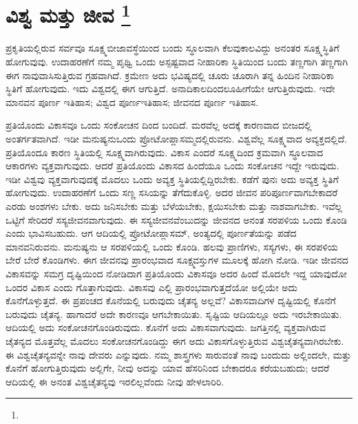 
\vspace{-0.5cm}

\chapter[ವಿಶ್ವ ಮತ್ತು ಜೀವ ]{ವಿಶ್ವ ಮತ್ತು ಜೀವ \protect\footnote{}}

ಪ್ರಕೃತಿಯಲ್ಲಿರುವ ಸರ್ವವೂ ಸೂಕ್ಷ್ಮಬೀಜಾವಸ್ಥೆಯಿಂದ ಬಂದು ಸ್ಥೂಲವಾಗಿ ಕೆಲವು\break ಕಾಲವಿದ್ದು ಅನಂತರ ಸೂಕ್ಷ್ಮಸ್ಥಿತಿಗೆ ಹೋಗುವುವು. ಉದಾಹರಣೆಗೆ ನಮ್ಮ ಪೃಥ್ವಿ ಒಂದು ಅಸ್ಪಷ್ಟವಾದ ನೀಹಾರಿಕಾ ಸ್ಥಿತಿಯಿಂದ ಬಂದು ತಣ್ಣಗಾಗಿ ತಣ್ಣಗಾಗಿ ಈಗ ನಾವು\break ವಾಸಿಸುತ್ತಿರುವ ಗ್ರಹವಾಗಿದೆ. ಕ್ರಮೇಣ ಅದು ಭವಿಷ್ಯದಲ್ಲಿ ಚೂರು ಚೂರಾಗಿ ತನ್ನ ಹಿಂದಿನ ನೀಹಾರಿಕಾ ಸ್ಥಿತಿಗೆ ಹೋಗುವುದು. ಇದು ವಿಶ್ವದಲ್ಲಿ ಈಗ ಆಗುತ್ತಿದೆ. ಅನಾದಿಕಾಲದಿಂದಲೂ\break ಹೀಗೆಯೇ ಆಗುತ್ತಿರುವುದು. ಇದೇ ಮಾನವನ ಪೂರ್ಣ ಇತಿಹಾಸ; ವಿಶ್ವದ ಪೂರ್ಣ\break ಇತಿಹಾಸ; ಜೀವನದ ಪೂರ್ಣ ಇತಿಹಾಸ.

ಪ್ರತಿಯೊಂದು ವಿಕಾಸವೂ ಒಂದು ಸಂಕೋಚನ  ದಿಂದ ಬಂದಿದೆ. ಮರವೆಲ್ಲ ಅದಕ್ಕೆ ಕಾರಣವಾದ ಬೀಜದಲ್ಲಿ ಅಂತರ್ಗತವಾಗಿದೆ. ಇಡೀ ಮನುಷ್ಯನು\break ಒಂದು ಪ್ರೋಟೋಪ್ಲಾಸಮ್ಮದಲ್ಲಿರುವನು. ವಿಶ್ವವೆಲ್ಲ ಸೂಕ್ಷ್ಮವಾದ ಅವ್ಯಕ್ತದಲ್ಲಿದೆ. ಪ್ರತಿಯೊಂದೂ ಕಾರಣ ಸ್ಥಿತಿಯಲ್ಲಿ ಸೂಕ್ಷ್ಮವಾಗಿರುವುದು. ವಿಕಾಸ ಎಂದರೆ ಸೂಕ್ಷ್ಮದಿಂದ ಕ್ರಮವಾಗಿ ಸ್ಥೂಲವಾದ ಆಕಾರಗಳು ವ್ಯಕ್ತವಾಗುವುದು. ಆದರೆ ಪ್ರತಿಯೊಂದು ವಿಕಾಸದ ಹಿಂದೆಯೂ ಒಂದು ಸಂಕೋಚನ ಇದ್ದೇ ಇರುವುದು. ಇಡೀ ವಿಶ್ವವು ವ್ಯಕ್ತವಾಗುವುದಕ್ಕೆ ಮೊದಲು ಒಂದು ಅವ್ಯಕ್ತ ಸ್ಥಿತಿಯಲ್ಲಿದ್ದಿರಬೇಕು. ಕಡೆಗೆ ಪುನಃ ಅದು ಅವ್ಯಕ್ತ ಸ್ಥಿತಿಗೆ ಹೋಗುವುದು. ಉದಾಹರಣೆಗೆ ಒಂದು ಸಣ್ಣ ಸಸಿಯನ್ನು ತೆಗೆದುಕೊಳ್ಳಿ. ಅದರ ಜೀವನ ಪರಿಪೂರ್ಣವಾಗಬೇಕಾದರೆ ಎರಡು ಅಂಶಗಳು ಬೇಕು. ಅದು ಜನಿಸಬೇಕು ಮತ್ತು ಬೆಳೆಯಬೇಕು, ಕ್ಷಯಿಸಬೇಕು ಮತ್ತು ನಾಶವಾಗಬೇಕು. ಇವೆಲ್ಲ ಒಟ್ಟಿಗೆ ಸೇರಿದರೆ ಸಸ್ಯಜೀವನವಾಗುವುದು. ಈ ಸಸ್ಯಜೀವನವೆಂಬುದನ್ನು ಜೀವನದ ಅನಂತ ಸರಪಳಿಯ ಒಂದು ಕೊಂಡಿ ಎಂದು ಭಾವಿಸಬಹುದು. ಆಗ ಆದಿಯಲ್ಲಿ ಪ್ರೋಟೋಪ್ಲಾಸಮ್​, ಅಂತ್ಯದಲ್ಲಿ ಪೂರ್ಣತೆಯನ್ನು ಪಡೆದ ಮಾನವನಿರುವನು. ಮನುಷ್ಯನು ಆ ಸರಪಳಿಯಲ್ಲಿ ಒಂದು ಕೊಂಡಿ. ಹಲವು ಪ್ರಾಣಿಗಳು, ಸಸ್ಯಗಳು, ಈ ಸರಪಳಿಯ ಬೇರೆ ಬೇರೆ ಕೊಂಡಿಗಳು. ಈಗ ಜೀವನವು ಪ್ರಾರಂಭವಾದ ಸೂಕ್ಷ್ಮವಸ್ತುಗಳ ಮೂಲಕ್ಕೆ ಹೋಗಿ ನೋಡಿ. ಇಡೀ ಜೀವನದ ವಿಕಾಸವನ್ನು ಸಮಗ್ರ ದೃಷ್ಟಿಯಿಂದ ನೋಡಿದಾಗ ಪ್ರತಿಯೊಂದು ವಿಕಾಸವೂ ಅದರ ಹಿಂದೆ ಮೊದಲೇ ಇದ್ದ ಯಾವುದೋ ಒಂದರ ವಿಕಾಸ ಎಂದು ಗೊತ್ತಾಗುವುದು. ವಿಕಾಸವು ಎಲ್ಲಿ ಪ್ರಾರಂಭವಾಗುತ್ತದೆಯೋ ಅಲ್ಲಿಯೇ ಅದು ಕೊನೆಗೊಳ್ಳುತ್ತದೆ. ಈ ಪ್ರಪಂಚದ ಕೊನೆಯಲ್ಲಿ ಬರುವುದು ಚೈತನ್ಯ ಅಲ್ಲವೆ? ವಿಕಾಸವಾದಿಗಳ ದೃಷ್ಟಿಯಲ್ಲಿ ಕೊನೆಗೆ ಬರುವುದು ಚೈತನ್ಯ. ಹಾಗಾದರೆ ಅದೇ ಕಾರಣವೂ ಆಗಬೇಕಾಯಿತು. ಸೃಷ್ಟಿಯ ಆದಿಯಲ್ಲೂ ಅದು ಇರಬೇಕಾಯಿತು. ಆದಿಯಲ್ಲಿ ಅದು ಸಂಕೋಚನಗೊಂಡಿರುವುದು. ಕೊನೆಗೆ ಅದು ವಿಕಾಸವಾಗುವುದು. ಜಗತ್ತಿನಲ್ಲಿ ವ್ಯಕ್ತವಾಗಿರುವ ಚೈತನ್ಯದ ಮೊತ್ತವೆಲ್ಲ ಮೊದಲು ಸಂಕೋಚನಗೊಂಡಿದ್ದು ಈಗ ಅದು ವಿಕಾಸಗೊಳ್ಳುತ್ತಿರುವ ವಿಶ್ವಚೈತನ್ಯವಾಗಿರಬೇಕು. ಈ ವಿಶ್ವಚೈತನ್ಯವನ್ನೇ ನಾವು ದೇವರು ಎನ್ನುವುದು. ನಮ್ಮ ಶಾಸ್ತ್ರಗಳು ಸಾರುವಂತೆ ನಾವು ಬಂದುದು ಅಲ್ಲಿಂದಲೇ, ಮತ್ತು ಕೊನೆಗೆ ಹೋಗುತ್ತಿರುವುದು ಅಲ್ಲಿಗೇ, ನೀವು ಅದನ್ನು ಯಾವ ಹೆಸರಿನಿಂದ ಬೇಕಾದರೂ ಕರೆಯಬಹುದು; ಆದರೆ ಆದಿಯಲ್ಲಿ ಈ ಅನಂತ ವಿಶ್ವಚೈತನ್ಯವು ಇರಲಿಲ್ಲವೆಂದು ನೀವು ಹೇಳಲಾರಿರಿ.

